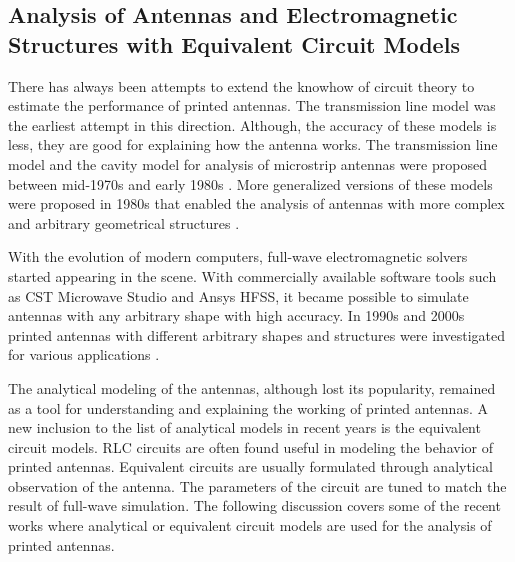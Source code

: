 \subsection{Analysis of Antennas and Electromagnetic Structures with Equivalent Circuit Models}
There has always been attempts to extend the knowhow of circuit theory to estimate the performance of printed antennas. The transmission line model was the earliest attempt in this direction. Although, the accuracy of these models is less, they are good for explaining how the antenna works. The transmission line model and the cavity model for analysis of microstrip antennas were proposed between mid-1970s and early 1980s \cite{txmPhasedArray, txmLinP, txmRect, txmMc, txmLossy, txmPMA, txm_opt, txm_wideband}. More generalized versions of these models were proposed in 1980s that enabled the analysis of antennas with more complex and arbitrary geometrical structures \cite{gtlmThesis, gtlmMath, gtlm2, gtlmAnnular, gtlmSectorCirc, gtlmAnnuRing, gtlmElliptRing}.

With the evolution of modern computers, full-wave electromagnetic solvers started appearing in the scene. With commercially available software tools such as CST Microwave Studio{\circledR} and Ansys HFSS{\circledR}, it became possible to simulate antennas with any arbitrary shape with high accuracy. In 1990s and 2000s printed antennas with different arbitrary shapes and structures were investigated for various applications \cite{smallPatch0, BandSize0, HPatch1, uslot1, dualBandCircPol, dualBandWLAN, fractal1, slottedUWB, bandnotchCSRR1, bandnotchEBG1, SlottedPatchModel, spiralSlotGnd, GndSRRPatch}.

The analytical modeling of the antennas, although lost its popularity, remained as a tool for understanding and explaining the working of printed antennas. A new inclusion to the list of analytical models in recent years is the equivalent circuit models. RLC circuits are often found useful in modeling the behavior of printed antennas. Equivalent circuits are usually formulated through analytical observation of the antenna. The parameters of the circuit are tuned to match the result of full-wave simulation. The following discussion covers some of the recent works where analytical or equivalent circuit models are used for the analysis of printed antennas.

